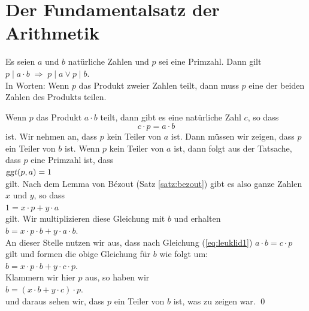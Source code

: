 \section{Der Fundamentalsatz der Arithmetik}
\begin{Satz} \lb
Es seien $a$ und $b$ nat\"{u}rliche Zahlen und $p$ sei eine Primzahl.  Dann gilt
\\[0.2cm]
\hspace*{1.3cm}
$p \mid a \cdot b \;\Rightarrow\; p \mid a  \vee p \mid b$.
\\[0.2cm]
In Worten: Wenn $p$ das Produkt zweier Zahlen teilt, dann muss $p$ eine der beiden Zahlen
des Produkts teilen.  
\end{Satz}

\proof
Wenn $p$ das Produkt $a \cdot b$ teilt, dann gibt es eine nat\"{u}rliche Zahl $c$, so dass
\begin{equation}
  \label{eq:leuklid1}
  c \cdot p = a \cdot b
\end{equation}
ist.  Wir nehmen an, dass $p$ kein Teiler von $a$ ist.  Dann m\"{u}ssen wir zeigen, dass $p$ ein
Teiler von $b$ ist.  Wenn $p$ kein Teiler von $a$ ist, dann folgt aus der Tatsache, dass
$p$ eine Primzahl ist, dass
\\[0.2cm]
\hspace*{1.3cm}
$\textsl{ggt}(p, a) = 1$
\\[0.2cm]
gilt.  Nach dem Lemma von B\'{e}zout (Satz \ref{satz:bezout}) gibt es also ganze Zahlen $x$
und $y$, so dass 
\\[0.2cm]
\hspace*{1.3cm}
$1 = x \cdot p + y \cdot a$
\\[0.2cm]
gilt.  Wir multiplizieren diese Gleichung mit $b$ und erhalten
\\[0.2cm]
\hspace*{1.3cm}
$b = x \cdot p \cdot b + y \cdot a \cdot b$.
\\[0.2cm]
An dieser Stelle nutzen wir aus, dass nach Gleichung (\ref{eq:leuklid1}) 
$a \cdot b = c \cdot p$ gilt und formen die obige Gleichung f\"{u}r $b$ wie folgt um:
\\[0.2cm]
\hspace*{1.3cm}
$b = x \cdot p \cdot b + y \cdot c \cdot p$.
\\[0.2cm]
Klammern wir hier $p$ aus, so haben wir
\\[0.2cm]
\hspace*{1.3cm}
$b = (x \cdot b + y \cdot c) \cdot p$.
\\[0.2cm]
und daraus sehen wir, dass $p$ ein Teiler von $b$ ist, was zu zeigen war. \qed
\vspace*{0.3cm}

